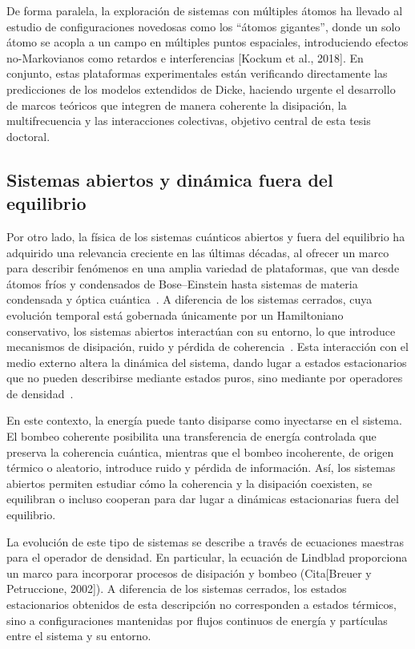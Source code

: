 \documentclass[onecolumn,notitlepage,letterpaper,aps,pra,12pt]{article}
\numberwithin{equation}{section}
\begin{document}
De forma paralela, la exploración de sistemas con múltiples átomos ha llevado al estudio de configuraciones novedosas como los ``átomos gigantes'', donde un solo átomo se acopla a un campo en múltiples puntos espaciales, introduciendo efectos no-Markovianos como retardos e interferencias [Kockum et al., 2018]. En conjunto, estas plataformas experimentales están verificando directamente las predicciones de los modelos extendidos de Dicke, haciendo urgente el desarrollo de marcos teóricos que integren de manera coherente la disipación, la multifrecuencia y las interacciones colectivas, objetivo central de esta tesis doctoral.


\subsection{Sistemas abiertos y dinámica fuera del equilibrio}

Por otro lado, la física de los sistemas cuánticos abiertos y fuera del equilibrio ha adquirido una relevancia creciente en las últimas décadas, al ofrecer un marco para describir fenómenos en una amplia variedad de plataformas, que van desde átomos fríos y condensados de Bose–Einstein hasta sistemas de materia condensada y óptica cuántica~\cite{rotter2015}.
A diferencia de los sistemas cerrados, cuya evolución temporal está gobernada únicamente por un Hamiltoniano conservativo, los sistemas abiertos interactúan  con su entorno, lo que introduce mecanismos de disipación, ruido y pérdida de coherencia~\cite{Sieberer2016}. Esta interacción con el medio externo altera la dinámica del sistema, dando lugar a estados estacionarios que no pueden describirse mediante estados puros, sino mediante por operadores de densidad~\cite{breuer2003}.

En este contexto, la energía puede tanto disiparse como inyectarse en el sistema. El bombeo coherente posibilita una transferencia de energía controlada que preserva la coherencia cuántica, mientras que el bombeo incoherente, de origen térmico o aleatorio, introduce ruido y pérdida de información. Así, los sistemas abiertos permiten estudiar cómo la coherencia y la disipación coexisten, se equilibran o incluso cooperan para dar lugar a dinámicas estacionarias fuera del equilibrio.

La evolución de este tipo de sistemas se describe a través de ecuaciones maestras para el operador de densidad. En particular, la ecuación de Lindblad proporciona un marco  para incorporar procesos de disipación y bombeo (Cita[Breuer y Petruccione, 2002]). A diferencia de los sistemas cerrados, los estados estacionarios obtenidos de esta descripción no corresponden a estados térmicos, sino a configuraciones mantenidas por flujos continuos de energía y partículas entre el sistema y su entorno.
\end{document}
